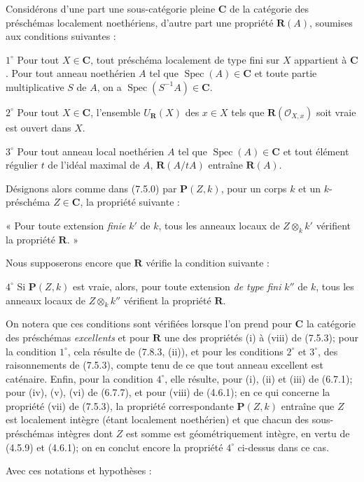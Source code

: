 \begin{env}[7.9.7]
\label{IV.2.s7.9.7-fr}
Considérons d'une part une sous-catégorie pleine $\boldsymbol{C}$ de la catégorie
des préschémas localement noethériens, d'autre part une propriété
$\boldsymbol R(A)$, soumises aux conditions suivantes :

$1^\circ$ Pour tout $X\in\boldsymbol{C}$, tout préschéma localement de type fini
sur $X$ appartient à $\boldsymbol{C}$. Pour tout anneau noethérien $A$ tel que
$\operatorname{Spec}(A)\in\boldsymbol{C}$ et toute partie multiplicative $S$ de
$A$, on a $\operatorname{Spec}(S^{-1}A)\in\boldsymbol{C}$.

$2^\circ$ Pour tout $X\in\boldsymbol{C}$, l'ensemble
$U_{\mathbf{R}}(X)$ des $x\in X$ tels que
$\boldsymbol R(\mathcal O_{X,x})$ soit vraie est ouvert dans $X$.

$3^\circ$ Pour tout anneau local noethérien $A$ tel que
$\operatorname{Spec}(A)\in\boldsymbol{C}$ et tout élément régulier $t$ de l'idéal
maximal de $A$, $\boldsymbol R(A/tA)$ entraîne $\boldsymbol R(A)$.

Désignons alors comme dans (7.5.0) par $\boldsymbol P(Z,k)$, pour un corps $k$
et un $k$-préschéma $Z\in\boldsymbol{C}$, la propriété suivante :


« Pour toute extension \emph{finie} $k'$ de $k$, tous les anneaux locaux de
$Z\otimes_k k'$ vérifient la propriété $\boldsymbol R$. »

Nous supposerons encore que $\boldsymbol R$ vérifie la condition suivante :

$4^\circ$ Si $\boldsymbol P(Z,k)$ est vraie, alors, pour toute extension
\emph{de type fini} $k''$ de $k$, tous les anneaux locaux de
$Z\otimes_k k''$ vérifient la propriété $\boldsymbol R$.

On notera que ces conditions sont vérifiées lorsque l'on prend pour
$\boldsymbol{C}$ la catégorie des préschémas \emph{excellents} et pour
$\boldsymbol R$ une des propriétés (i) à (viii) de (7.5.3); pour la condition
$1^\circ$, cela résulte de (7.8.3, (ii)), et pour les conditions $2^\circ$ et
$3^\circ$, des raisonnements de (7.5.3), compte tenu de ce que tout anneau
excellent est caténaire. Enfin, pour la condition $4^\circ$, elle résulte,
pour (i), (ii) et (iii) de (6.7.1); pour (iv), (v), (vi) de (6.7.7), et pour
(viii) de (4.6.1); en ce qui concerne la propriété (vii) de (7.5.3), la
propriété correspondante $\boldsymbol P(Z,k)$ entraîne que $Z$ est localement
intègre (étant localement noethérien) et que chacun des sous-préschémas
intègres dont $Z$ est somme est géométriquement intègre, en vertu de (4.5.9)
et (4.6.1); on en conclut encore la propriété $4^\circ$ ci-dessus dans ce cas.

Avec ces notations et hypothèses :
\end{env}

